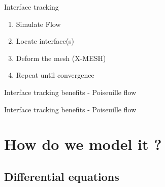 \documentclass{beamer}  %
\begin{document}
\begin{frame}{Interface tracking}
    \begin{enumerate}
        \item Simulate Flow
        \item Locate interface(s)
        \item Deform the mesh (X-MESH)
        \item Repeat until convergence
    \end{enumerate}
\end{frame}

\begin{frame}{Interface tracking benefits - Poiseuille flow}
    \begin{figure}
        \centering
        
    \end{figure}
\end{frame}

\begin{frame}{Interface tracking benefits - Poiseuille flow}
    \begin{figure}
        \begin{overprint}
            \end{overprint} 
    \end{figure}
\end{frame}


\section{How do we model it ?}
\subsection{Differential equations}
\end{document}
